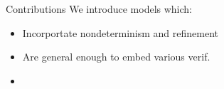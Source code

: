 \documentclass[aspectratio=54]{beamer}
\begin{document}
\begin{frame}{Contributions}
  We introduce models which:
  \begin{itemize}
    \item Incorportate nondeterminism and refinement
    \item Are general enough to embed various verif.
    \item 
  \end{itemize}
\end{frame}


%
%
%
%
%
%
%
%
%
%
%
%
\end{document}
